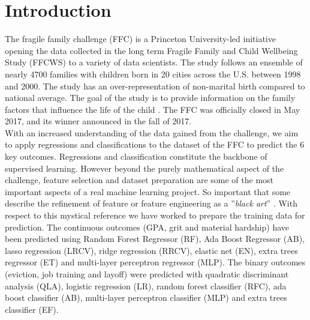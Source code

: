 \section{Introduction}
The fragile family challenge (FFC) is a Princeton University-led initiative opening the data collected in the long term Fragile Family and Child Wellbeing Study (FFCWS) to a variety of data scientists. The study follows an ensemble of nearly 4700 families with children born in 20 cities across the U.S. between 1998 and 2000. The study has an over-representation of non-marital birth compared to national average. The goal of the study is to provide information on the family factors that influence the life of the child  \cite{reichman2001fragile}. The FFC was officially closed in May 2017, and its winner announced in the fall of 2017. \\
With an increased understanding of the data gained from the challenge, we aim to apply regressions and classifications to the dataset of the FFC to predict the 6 key outcomes. Regressions and classification constitute the backbone of supervised learning. However beyond the purely mathematical aspect of the challenge, feature selection and dataset preparation are some of the most important aspects of a real machine learning project. So important that some describe the refinement of feature or feature engineering as a ''\textit{black art}'' \cite{domingos2012few}. With respect to this mystical reference we have worked to prepare the training data for prediction. The continuous outcomes (GPA, grit and material hardship) have been predicted using Random Forest Regressor (RF), Ada Boost Regressor (AB), lasso regression (LRCV), ridge regression (RRCV), elastic net (EN), extra trees regressor (ET) and multi-layer perceptron regressor (MLP). The binary outcomes (eviction, job training and layoff) were predicted with quadratic discriminant analysis (QLA), logistic regression (LR), random forest classifier (RFC), ada boost classifier (AB),  multi-layer perceptron classifier (MLP) and extra trees classifier (EF).
